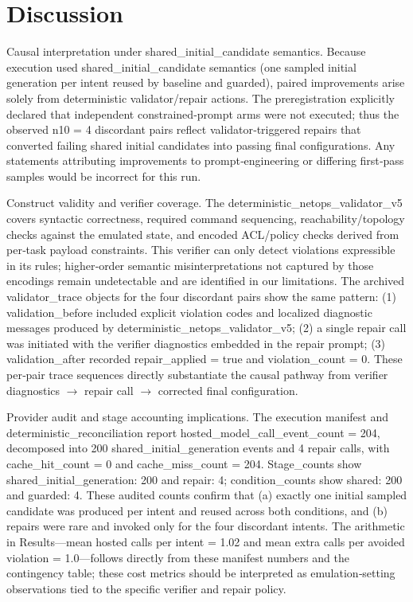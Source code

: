 \documentclass[conference]{IEEEtran}
\begin{document}
\section{Discussion}
Causal interpretation under shared\_initial\_candidate semantics. Because execution used shared\_initial\_candidate semantics (one sampled initial generation per intent reused by baseline and guarded), paired improvements arise solely from deterministic validator/repair actions. The preregistration explicitly declared that independent constrained‑prompt arms were not executed; thus the observed n10 = 4 discordant pairs reflect validator‑triggered repairs that converted failing shared initial candidates into passing final configurations. Any statements attributing improvements to prompt‑engineering or differing first‑pass samples would be incorrect for this run.

Construct validity and verifier coverage. The deterministic\_netops\_validator\_v5 covers syntactic correctness, required command sequencing, reachability/topology checks against the emulated state, and encoded ACL/policy checks derived from per‑task payload constraints. This verifier can only detect violations expressible in its rules; higher‑order semantic misinterpretations not captured by those encodings remain undetectable and are identified in our limitations. The archived validator\_trace objects for the four discordant pairs show the same pattern: (1) validation\_before included explicit violation codes and localized diagnostic messages produced by deterministic\_netops\_validator\_v5; (2) a single repair call was initiated with the verifier diagnostics embedded in the repair prompt; (3) validation\_after recorded repair\_applied = true and violation\_count = 0. These per‑pair trace sequences directly substantiate the causal pathway from verifier diagnostics \ensuremath{\rightarrow} repair call \ensuremath{\rightarrow} corrected final configuration.

Provider audit and stage accounting implications. The execution manifest and deterministic\_reconciliation report hosted\_model\_call\_event\_count = 204, decomposed into 200 shared\_initial\_generation events and 4 repair calls, with cache\_hit\_count = 0 and cache\_miss\_count = 204. Stage\_counts show shared\_initial\_generation: 200 and repair: 4; condition\_counts show shared: 200 and guarded: 4. These audited counts confirm that (a) exactly one initial sampled candidate was produced per intent and reused across both conditions, and (b) repairs were rare and invoked only for the four discordant intents. The arithmetic in Results---mean hosted calls per intent = 1.02 and mean extra calls per avoided violation = 1.0---follows directly from these manifest numbers and the contingency table; these cost metrics should be interpreted as emulation‑setting observations tied to the specific verifier and repair policy.
\end{document}
